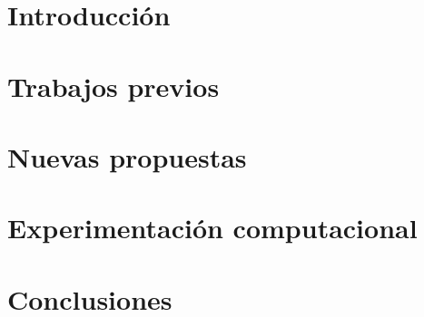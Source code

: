 \documentclass[11pt,a4paper]{tesis}
\begin{document}
\def\titulo{Licenciado }
\def\autor{Amit Stein, Juan Andrés Knebel}
\def\tituloTesis{Nuevos algoritmos para recuperación de ``ítems empaquetados'': \mbox{Algo}}
\def\runtitulo{Nuevos algoritmos para recuperación de ``ítems empaquetados''}
\def\runtitle{New Algorithms for composite retrival}
\def\director{Obi-Wan Kenobi}
\def\codirector{Master Yoda}
\def\lugar{Buenos Aires, 2016}
%

\frontmatter
\pagestyle{empty}


\cleardoublepage
%



\cleardoublepage
\tableofcontents

\mainmatter
\pagestyle{headings}


\chapter{Introducción}
\label{chap:introduccion}

\chapter{Trabajos previos}
\label{chap:trabajos-previos}

\chapter{Nuevas propuestas}
\label{chap:nuevas-propuestas}

\chapter{Experimentación computacional}
\label{chap:experimentacion}

\chapter{Conclusiones}
\label{chap:conclusiones}

%
%
%


\backmatter

 
\end{document}
